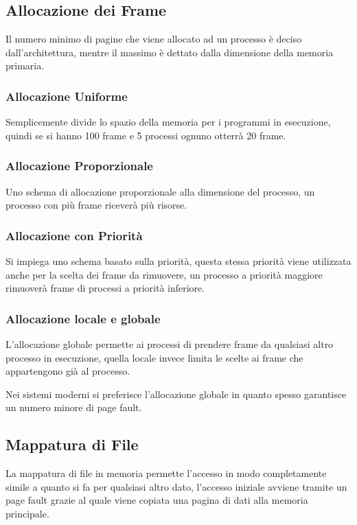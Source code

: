 \subsection{Allocazione dei Frame}
Il numero minimo di pagine che viene allocato ad un processo è deciso dall'architettura, mentre il massimo è dettato dalla dimensione della memoria primaria.

\subsubsection*{Allocazione Uniforme}
Semplicemente divide lo spazio della memoria per i programmi in esecuzione, quindi se si hanno 100 frame e 5 processi ognuno otterrà 20 frame.

\subsubsection*{Allocazione Proporzionale}
Uno schema di allocazione proporzionale alla dimensione del processo, un processo con più frame riceverà più risorse.

\subsubsection*{Allocazione con Priorità}
Si impiega uno schema basato sulla priorità, questa stessa priorità viene utilizzata anche per la scelta dei frame da rimuovere, un processo a priorità maggiore rimuoverà frame di processi a priorità inferiore.

\subsubsection*{Allocazione locale e globale}
L'allocazione globale permette ai processi di prendere frame da qualsiasi altro processo in esecuzione, quella locale invece limita le scelte ai frame che appartengono già al processo.

\spacer
Nei sistemi moderni si preferisce l'allocazione globale in quanto spesso garantisce un numero minore di page fault.

\subsection{Mappatura di File}
La mappatura di file in memoria permette l'accesso in modo completamente simile a quanto si fa per qualsiasi altro dato, l'accesso iniziale avviene tramite un page fault grazie al quale viene copiata una pagina di dati alla memoria principale.

